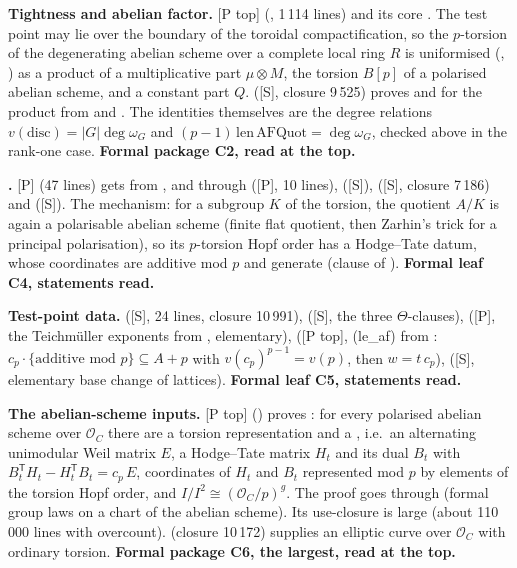 \documentclass[11pt]{article}
\newcommand{\mP}{\textsf{[P]}}
\newcommand{\mPt}{\textsf{[P top]}}
\newcommand{\mS}{\textsf{[S]}}
\newcommand{\cO}{\mathcal O}
\theoremstyle{remark}
\begin{document}
\textbf{Tightness and abelian factor.} \mPt{}  (, 1\,114 lines) and its core . The test point may lie over the boundary of the toroidal compactification, so the $p$-torsion of the degenerating abelian scheme over a complete local ring $R$ is uniformised (, ) as a product of a multiplicative part $\mu\otimes M$, the torsion $B[p]$ of a polarised abelian scheme, and a constant part $Q$.  (\mS, closure 9\,525) proves  and  for the product from  and . The identities themselves are the degree relations $v(\mathrm{disc})=|G|\deg\omega_G$ and $(p-1)\,\mathrm{len}\,\mathrm{AFQuot}=\deg\omega_G$, checked above in the rank-one case. \textbf{Formal package C2, read at the top.}

\textbf{.} \mP{}  (47 lines) gets  from ,  and  through  (\mP, 10 lines),  (\mS),  (\mS, closure 7\,186) and  (\mS). The mechanism: for a subgroup $K$ of the torsion, the quotient $A/K$ is again a polarisable abelian scheme (finite flat quotient, then Zarhin's trick for a principal polarisation), so its $p$-torsion Hopf order has a Hodge--Tate datum, whose coordinates are additive mod $p$ and generate (clause  of ). \textbf{Formal leaf C4, statements read.}

\textbf{Test-point data.}  (\mS, 24 lines, closure 10\,991),  (\mS, the three $\Theta$-clauses),  (\mP, the Teichm\"uller exponents from , elementary),  (\mPt, (le\_af) from : $c_p\cdot\{\text{additive mod }p\}\subseteq A+p$ with $v(c_p)^{p-1}=v(p)$, then $w=t\,c_p$),  (\mS, elementary base change of lattices). \textbf{Formal leaf C5, statements read.}

\textbf{The abelian-scheme inputs.} \mPt{}  () proves : for every polarised abelian scheme over $\cO_C$ there are a torsion representation and a , i.e.\ an alternating unimodular Weil matrix $E$, a Hodge--Tate matrix $H_t$ and its dual $B_t$ with $B_t^{\mathsf T}H_t-H_t^{\mathsf T}B_t=c_p\,E$, coordinates of $H_t$ and $B_t$ represented mod $p$ by elements of the torsion Hopf order, and $I/I^2\cong(\cO_C/p)^g$. The proof goes through  (formal group laws on a chart of the abelian scheme). Its use-closure is large (about 110\,000 lines with overcount).  (closure 10\,172) supplies an elliptic curve over $\cO_C$ with ordinary torsion. \textbf{Formal package C6, the largest, read at the top.}
\end{document}
